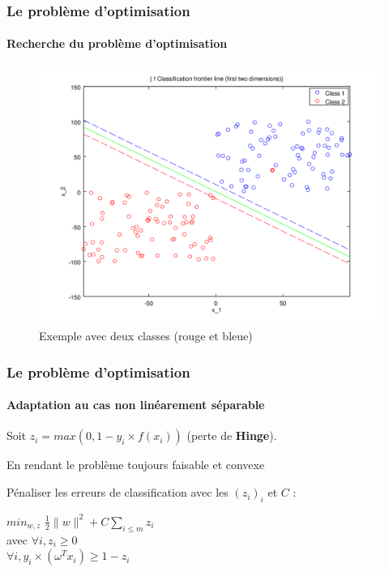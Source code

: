 \documentclass{beamer}
\begin{document}
\begin{frame}
\frametitle{Le problème d'optimisation}
\framesubtitle{Recherche du problème d'optimisation}

         \begin{figure}
         \centering
         \caption{Exemple avec deux classes (rouge et bleue)}
         \includegraphics[scale=0.4]{images/voronoi2.png}
         \end{figure}

\end{frame}

\begin{frame}
\frametitle{Le problème d'optimisation}
\framesubtitle{Adaptation au cas non linéarement séparable}

Soit $z_i = max(0, 1-y_i \times f(x_i))$ (perte de \textbf{Hinge}).

\pause

\bigskip

\begin{block}{En rendant le problème toujours faisable et convexe}

Pénaliser les erreurs de classification avec les $(z_i)_i$ et $C$ :

           \begin{center}
           $min_{w, z}$ $\frac{1}{2} \|w\|^2 + C \sum_{i \leq m}z_i$\\
           avec $\forall i, z_i \geq 0$\\
           $\forall i, y_i \times (\omega^{T} x_i) \geq 1 - z_i$\\
           \end{center}

\end{block}

\end{frame}
\end{document}
